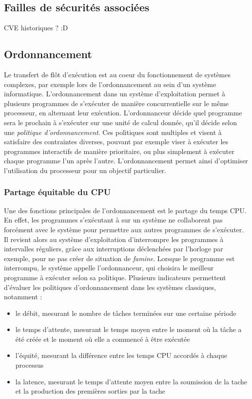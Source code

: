 		\subsection{Failles de sécurités associées}
			CVE historiques ? :D


		\subsection{Ordonnancement}

		Le transfert de flôt d'exécution est au coeur du fonctionnement de systèmes complexes, par exemple lors de l'ordonnancement au sein d'un système informatique. L'ordonnancement dans un système d'exploitation permet à plusieurs programmes de s'exécuter de manière concurrentielle sur le même processeur, en alternant leur exécution. L'ordonnanceur décide quel programme sera le prochain à s'exécuter sur une unité de calcul donnée, qu'il décide selon une \emph{politique d'ordonnancement}. Ces politiques sont multiples et visent à satisfaire des contraintes diverses, pouvant par exemple viser à exécuter les programmes interactifs de manière prioritaire, ou plus simplement à exécuter chaque programme l'un après l'autre. L'ordonnancement permet ainsi d'optimiser l'utilisation du processeur pour un objectif particulier. 

			\subsubsection{Partage équitable du CPU}
		Une des fonctions principales de l'ordonnancement est le partage du temps CPU. En effet, les programmes s'exécutant à sur un système ne collaborent pas forcément avec le système pour permettre aux autres programmes de s'exécuter. Il revient alors au système d'exploitation d'interrompre les programmes à intervalles réguliers, grâce aux interruptions déclenchées par l'horloge par exemple, pour ne pas créer de situation de \emph{famine}. Lorsque le programme est interrompu, le système appelle l'ordonnanceur, qui choisira le meilleur programme à exécuter selon sa politique.
		Plusieurs indicateurs permettent d'évaluer les politiques d'ordonnancement dans les systèmes classiques, notamment :
		\begin{itemize}
			\item{le débit, mesurant le nombre de tâches terminées sur une certaine période}
			\item{le temps d'attente, mesurant le temps moyen entre le moment où la tâche a été créée et le moment où elle a commencé à être exécutée}
			\item{l'équité, mesurant la différence entre les temps CPU accordés à chaque processus}
			\item{la latence, mesurant le temps d'attente moyen entre la soumission de la tache et la production des premières sorties par la tache}
		\end{itemize}

